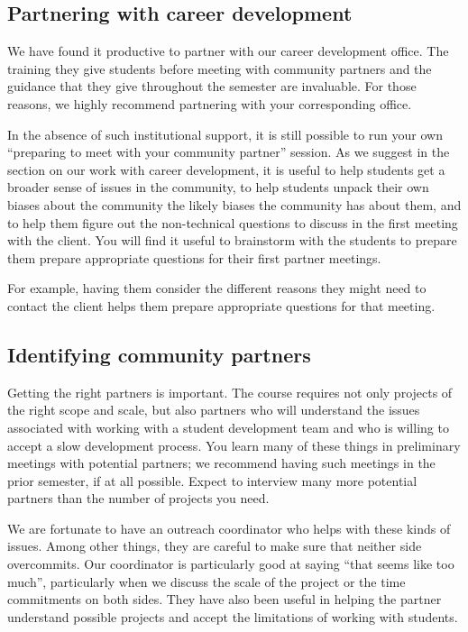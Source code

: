 \subsection{Partnering with career development}

We have found it productive to partner with our career development
office.  The training they give students before meeting with community
partners and the guidance that they give throughout the semester
are invaluable.  For those reasons, we highly recommend 
partnering with your corresponding office.

In the absence of such institutional support, it is still possible to run
your own ``preparing to meet with your community partner'' session.
As we suggest in the section on our work with career development,
it is useful to help students get a broader sense of issues in the
community, to help students unpack their own biases about the
community the likely biases the community has about them, and to
help them figure out the non-technical questions to discuss in the
first meeting with the client.  You will find it useful to brainstorm
with the students to prepare them prepare appropriate questions for
their first partner meetings.

For example, having them consider the different reasons they might
need to contact the client helps them prepare appropriate questions
for that meeting.

\subsection{Identifying community partners}

Getting the right partners is important.  The course requires not
only projects of the right scope and scale, but also partners who
will understand the issues associated with working with a student
development team and who is willing to accept a slow development
process.  You learn many of these things in preliminary meetings
with potential partners; we recommend having such meetings in the
prior semester, if at all possible.  Expect to interview many more
potential partners than the number of projects you need.

We are fortunate to have an outreach coordinator who helps with these kinds
of issues.  Among other things, they are careful to make sure that neither
side overcommits.  Our coordinator is particularly good at saying ``that
seems like too much'', particularly when we discuss the scale of the project
or the time commitments on both sides.  They have also been useful in
helping the partner understand possible projects and accept the limitations
of working with students.

